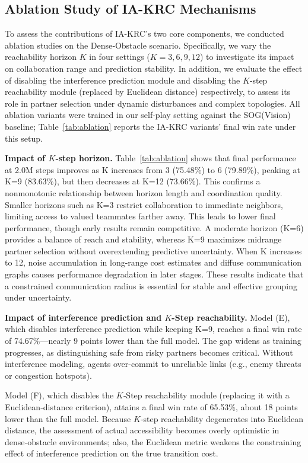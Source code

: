 \documentclass[10pt]{article} %
\begin{document}
\subsection{Ablation Study of IA-KRC Mechanisms}
    To assess the contributions of IA-KRC's two core components, we conducted ablation studies on the Dense‑Obstacle scenario. Specifically, we vary the reachability horizon $K$ in four settings ($K = 3, 6, 9, 12$) to investigate its impact on collaboration range and prediction stability. In addition, we evaluate the effect of disabling the interference prediction module and disabling the $K$‑step reachability module (replaced by Euclidean distance) respectively, to assess its role in partner selection under dynamic disturbances and complex topologies. All ablation variants were trained in our self-play setting against the SOG(Vision) baseline; Table~\ref{tab:ablation} reports the IA-KRC variants' final win rate under this setup.

\textbf{Impact of $K$‑step horizon.}  
Table~\ref{tab:ablation} shows that final performance at 2.0M steps improves as K increases from 3 (75.48\%) to 6 (79.89\%), peaking at K=9 (83.63\%), but then decreases at K=12 (73.66\%). This confirms a nonmonotonic relationship between horizon length and coordination quality. Smaller horizons such as K=3 restrict collaboration to immediate neighbors, limiting access to valued teammates farther away. This leads to lower final performance, though early results remain competitive. A moderate horizon (K=6) provides a balance of reach and stability, whereas K=9 maximizes midrange partner selection without overextending predictive uncertainty. When K increases to 12, noise accumulation in long-range cost estimates and diffuse communication graphs causes performance degradation in later stages. These results indicate that a constrained communication radius is essential for stable and effective grouping under uncertainty.


\textbf{Impact of interference prediction and $K$-Step reachability.}  
Model (E), which disables interference prediction while keeping K=9, reaches a final win rate of 74.67\%—nearly 9 points lower than the full model. The gap widens as training progresses, as distinguishing safe from risky partners becomes critical. Without interference modeling, agents over-commit to unreliable links (e.g., enemy threats or congestion hotspots).

Model (F), which disables the $K$‑Step reachability module (replacing it with a Euclidean‑distance criterion), attains a final win rate of 65.53\%, about 18 points lower than the full model. Because $K$‑step reachability degenerates into Euclidean distance, the assessment of actual accessibility becomes overly optimistic in dense‑obstacle environments; also, the Euclidean metric weakens the constraining effect of interference prediction on the true transition cost.
\end{document}

